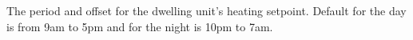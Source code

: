 The period and offset for the dwelling unit's heating setpoint. Default for the day is from 9am to 5pm and for the night is 10pm to 7am.
